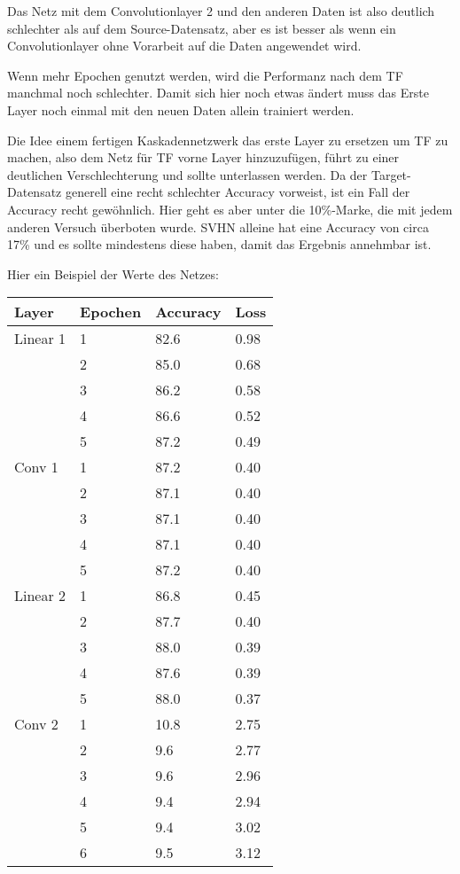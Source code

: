     Das Netz mit dem Convolutionlayer 2 und den anderen Daten ist also deutlich schlechter 
    als auf dem Source-Datensatz, aber es ist besser als wenn ein Convolutionlayer ohne Vorarbeit 
    auf die Daten angewendet wird.

    Wenn mehr Epochen genutzt werden, wird die Performanz nach dem TF manchmal 
    noch schlechter. Damit sich hier noch etwas ändert muss das Erste Layer noch 
    einmal mit den neuen Daten allein trainiert werden.

    Die Idee einem fertigen Kaskadennetzwerk das erste Layer zu ersetzen um TF zu machen, also 
    dem Netz für TF vorne Layer hinzuzufügen, führt zu einer deutlichen Verschlechterung und sollte 
    unterlassen werden. Da der Target-Datensatz generell eine recht schlechter Accuracy 
    vorweist, ist ein Fall der Accuracy recht gewöhnlich. Hier geht es aber unter die 10\%-Marke, 
    die mit jedem anderen Versuch überboten wurde. SVHN alleine hat eine Accuracy von circa 17\% und 
    es sollte mindestens diese haben, damit das Ergebnis annehmbar ist.

    Hier ein Beispiel der Werte des Netzes:

    \begin{table}[h!]
        \begin{tabular}{l|l|l|l}
            Layer & Epochen & Accuracy & Loss \\
            \hline
            Linear 1 & 1 & 82.6 & 0.98 \\
            & 2 & 85.0 & 0.68 \\
            & 3 & 86.2 & 0.58 \\
            & 4 & 86.6 & 0.52 \\
            & 5 & 87.2 & 0.49\\
            Conv 1 & 1 & 87.2 & 0.40 \\
            & 2 & 87.1 & 0.40 \\
            & 3 & 87.1 & 0.40 \\
            & 4 & 87.1 & 0.40 \\
            & 5 & 87.2 & 0.40 \\
            Linear 2 & 1 & 86.8 & 0.45 \\
            & 2 & 87.7 & 0.40 \\
            & 3 & 88.0 & 0.39 \\
            & 4 & 87.6 & 0.39 \\
            & 5 & 88.0 & 0.37 \\
            Conv 2 & 1 & 10.8 & 2.75 \\
            & 2 & 9.6 & 2.77 \\
            & 3 & 9.6 & 2.96 \\
            & 4 & 9.4 & 2.94 \\
            & 5 & 9.4 & 3.02 \\
            & 6 & 9.5 & 3.12 \\
        \end{tabular}
    \end{table}

